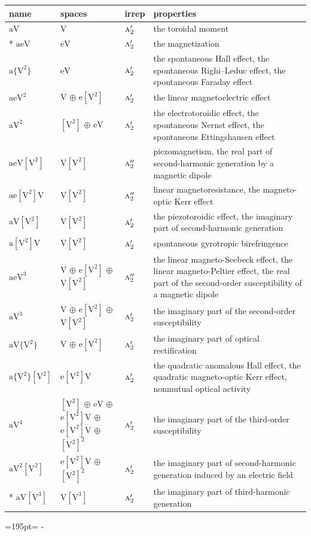 \documentclass[10pt,a4paper]{article}
\newcommand{\needspace}[1]{\par\penalty-100\begingroup\dimen0=#1\relax\dimen2=\pagegoal
  \advance\dimen2-\pagetotal\ifdim\dimen0>\dimen2\relax\ifdim\dimen2>0pt\vfil\break\fi\fi
  \endgroup}
\numberwithin{equation}{section}
\newcommand{\irr}[1]{\text{\normalfont\scshape #1}}
\newcommand{\jahn}[1]{\mathrm{#1}}
\newlength{\fillwidth}\newlength{\cellwidth}\newlength{\colwidth}
\begin{document}
{\begin{longtable}{@{}lll>{\RaggedRight\arraybackslash}p{\fillwidth}@{}}
name & spaces & irrep & properties\\\midrule\endhead
\bottomrule\endfoot\endlastfoot
$\jahn{aV}$ & $\jahn{V}$ & $\irr{a}_{2}'$ & the toroidal moment\\*
$\jahn{aeV}$ & $\jahn{eV}$ & $\irr{a}_{2}'$ & the magnetization\\
$\jahn{a\{V^{2}\}}$ & $\jahn{eV}$ & $\irr{a}_{2}'$ & the spontaneous Hall effect, the spontaneous Righi–Leduc effect, the spontaneous Faraday effect\\
$\jahn{aeV^{2}}$ & $\jahn{V}$ $\oplus$ $\jahn{e[V^{2}]}$ & $\irr{a}_{2}'$ & the linear magnetoelectric effect\\
$\jahn{aV^{2}}$ & $\jahn{[V^{2}]}$ $\oplus$ $\jahn{eV}$ & $\irr{a}_{2}'$ & the electrotoroidic effect, the spontaneous Nernst effect, the spontaneous Ettingshausen effect\\
$\jahn{aeV[V^{2}]}$ & $\jahn{V[V^{2}]}$ & $\irr{a}_{2}''$ & piezomagnetism, the real part of second-harmonic generation by a magnetic dipole\\
$\jahn{ae[V^{2}]V}$ & $\jahn{V[V^{2}]}$ & $\irr{a}_{2}''$ & linear magnetoresistance, the magneto-optic Kerr effect\\
$\jahn{aV[V^{2}]}$ & $\jahn{V[V^{2}]}$ & $\irr{a}_{2}'$ & the piezotoroidic effect, the imaginary part of second-harmonic generation\\
$\jahn{a[V^{2}]V}$ & $\jahn{V[V^{2}]}$ & $\irr{a}_{2}'$ & spontaneous gyrotropic birefringence\\
$\jahn{aeV^{3}}$ & $\jahn{V}$ $\oplus$ $\jahn{e[V^{2}]}$ $\oplus$ $\jahn{V[V^{2}]}$ & $\irr{a}_{2}''$ & the linear magneto-Seebeck effect, the linear magneto-Peltier effect, the real part of the second-order susceptibility of a magnetic dipole\\
$\jahn{aV^{3}}$ & $\jahn{V}$ $\oplus$ $\jahn{e[V^{2}]}$ $\oplus$ $\jahn{V[V^{2}]}$ & $\irr{a}_{2}'$ & the imaginary part of the second-order susceptibility\\
$\jahn{aV\{V^{2}\}}$ & $\jahn{V}$ $\oplus$ $\jahn{e[V^{2}]}$ & $\irr{a}_{2}'$ & the imaginary part of optical rectification\\
$\jahn{a\{V^{2}\}[V^{2}]}$ & $\jahn{e[V^{2}]V}$ & $\irr{a}_{2}'$ & the quadratic anomalous Hall effect, the quadratic magneto-optic Kerr effect, nonmutual optical activity\\
$\jahn{aV^{4}}$ & $\jahn{[V^{2}]}$ $\oplus$ $\jahn{eV}$ $\oplus$ $\jahn{e[V^{2}]V}$ $\oplus$ $\jahn{e[V^{2}]V}$ $\oplus$ $\jahn{[V^{2}]^{2}}$ & $\irr{a}_{2}'$ & the imaginary part of the third-order susceptibility\\
$\jahn{aV^{2}[V^{2}]}$ & $\jahn{e[V^{2}]V}$ $\oplus$ $\jahn{[V^{2}]^{2}}$ & $\irr{a}_{2}'$ & the imaginary part of second-harmonic generation induced by an electric field\\*
$\jahn{aV[V^{3}]}$ & $\jahn{V[V^{3}]}$ & $\irr{a}_{2}'$ & the imaginary part of third-harmonic generation\\
\bottomrule\end{longtable}}
\needspace{195pt}
\end{document}
